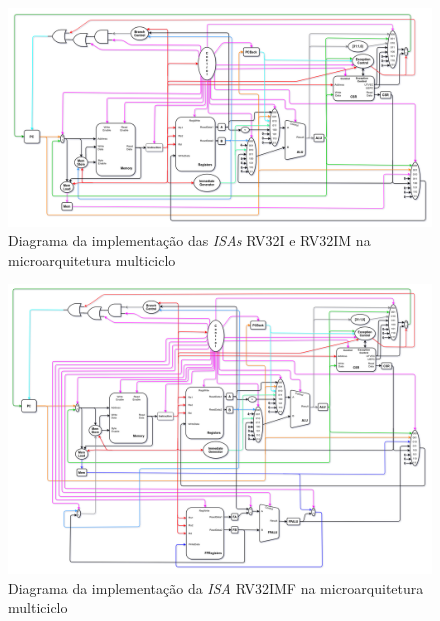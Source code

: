         \begin{figure}[H]
        \centering
            \includegraphics[angle=90,width=1\textwidth,height=1\textheight,keepaspectratio]{../images/uarch_diagrams/multicycle-RV32I-RV32IM.png}
            \caption{Diagrama da implementação das \textit{ISAs} RV32I e RV32IM na
            microarquitetura multiciclo}\label{fig:diagram_rv32i_multi}
        \end{figure}

        \begin{figure}[H]
        \centering
            \includegraphics[angle=90,width=1\textwidth,height=1\textheight,keepaspectratio]{../images/uarch_diagrams/multicycle-RV32IMF.png}
            \caption{Diagrama da implementação da \textit{ISA} RV32IMF na
            microarquitetura multiciclo}\label{fig:diagram_rv32imf_multi}
        \end{figure}


